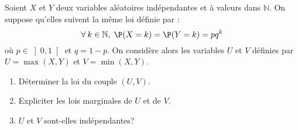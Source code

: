 \documentclass[a4paper,10pt]{report}
\begin{document}
\begin{Exa} Soient $X$ et $Y$ deux variables aléatoires indépendantes et à valeurs dans $\mathbb{N}$. On suppose qu'elles suivent la même loi définie par :
$$\forall\:k\in\mathbb{N}, \; \P(X=k)=\P(Y=k)=pq^k$$
où $p \in \left] 0,1\right[$ et $q=1-p$. On considère alors les variables $U$ et $V$ définies par $U=\max(X,Y)$ et $V=\min(X,Y)$.
\begin{enumerate}
\item
Déterminer la loi du couple $(U,V)$.
\item
Expliciter les lois marginales de $U$ et de $V$.
\item
$U$ et $V$ sont-elles indépendantes?
\end{enumerate}
\end{Exa}

\corr
\end{document}
